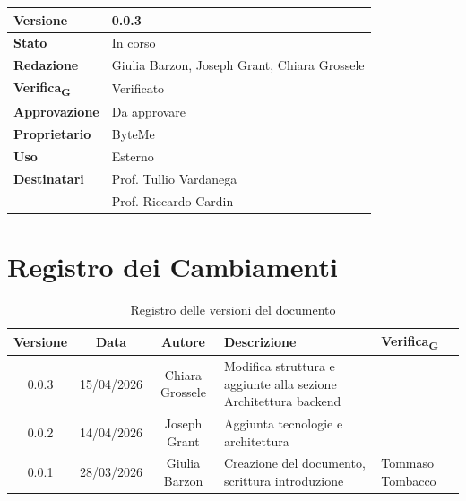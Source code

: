 \documentclass[11pt,a4paper]{article}
\newcommand{\gls}[1]{#1\textsubscript{G}}
\begin{document}
\begin{titlepage}
    \begin{table}[H]
        \centering
        \begin{tabular}{|l|p{5cm}|}
            \hline
            \textbf{Versione} & 0.0.3 \\
            \hline
            \textbf{Stato} & In corso \\
            \hline
            \textbf{Redazione} & Giulia Barzon, Joseph Grant, Chiara Grossele \\
            \hline
            \textbf{\gls{Verifica}} & Verificato \\
            \hline
            \textbf{Approvazione} & Da approvare\\
            \hline
            \textbf{Proprietario} & ByteMe \\
            \hline
            \textbf{Uso} & Esterno \\
            \hline
            \textbf{Destinatari} & Prof. Tullio Vardanega \\ & Prof. Riccardo Cardin \\
            \hline
        \end{tabular}
    \end{table}
    
    \vfill
\end{titlepage}

\thispagestyle{empty}
\section*{Registro dei Cambiamenti}

\begin{table}[H]
    \centering
    \begin{tabular}{|c|c|c|>{\raggedright\arraybackslash}p{}|p{}|}
        \hline
        \textbf{Versione} & \textbf{Data} & \textbf{Autore} & \textbf{Descrizione} & \textbf{\gls{Verifica}} \\
        \hline
        0.0.3 & 15/04/2026 & Chiara Grossele & Modifica struttura e aggiunte alla sezione Architettura backend& \\
        \hline
        0.0.2 & 14/04/2026 & Joseph Grant & Aggiunta tecnologie e architettura & \\
        \hline
        0.0.1 & 28/03/2026 & Giulia Barzon & Creazione del documento, scrittura introduzione & Tommaso Tombacco \\
        \hline
    \end{tabular}
    \caption{Registro delle versioni del documento}
    \label{tab:versionamento}
\end{table}
\newpage
\end{document}

